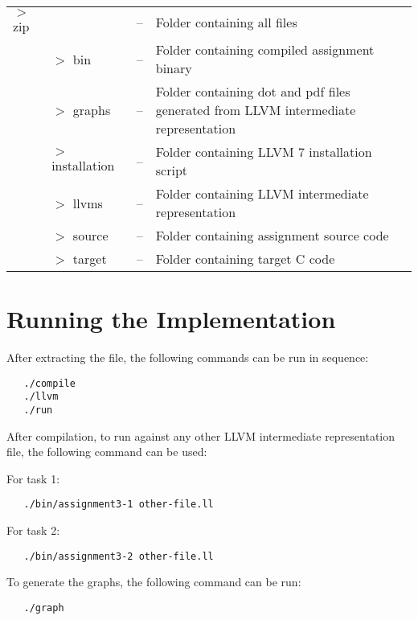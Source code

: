 \documentclass[11pt,a4paper,fleqn]{article}
\begin{document}
\begin{tabularx}{\linewidth}{l l l X}
   $>$ zip &                  & -- & Folder containing all files                                                         \\
           & $>$ bin          & -- & Folder containing compiled assignment binary                                        \\
           & $>$ graphs       & -- & Folder containing dot and pdf files generated from LLVM intermediate representation \\
           & $>$ installation & -- & Folder containing LLVM 7 installation script                                        \\
           & $>$ llvms        & -- & Folder containing LLVM intermediate representation                                  \\
           & $>$ source       & -- & Folder containing assignment source code                                            \\
           & $>$ target       & -- & Folder containing target C code                                                     \\
\end{tabularx}

\section {Running the Implementation}

After extracting the file, the following commands can be run in sequence:

\begin{verbatim}
   ./compile
   ./llvm
   ./run
\end{verbatim}

After compilation, to run against any other LLVM intermediate representation file, the following command can be used:

For task 1:
\begin{verbatim}
   ./bin/assignment3-1 other-file.ll
\end{verbatim}

For task 2:
\begin{verbatim}
   ./bin/assignment3-2 other-file.ll
\end{verbatim}

To generate the graphs, the following command can be run:

\begin{verbatim}
   ./graph
\end{verbatim}
\end{document}
